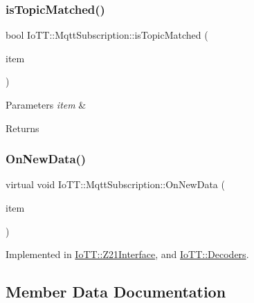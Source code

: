 \subsubsection{\texorpdfstring{is\+Topic\+Matched()}{isTopicMatched()}}
{\footnotesize\ttfamily bool Io\+T\+T\+::\+Mqtt\+Subscription\+::is\+Topic\+Matched (\begin{DoxyParamCaption}\item[{const \hyperlink{classIoTT_1_1mqttMessageQueueItem}{mqtt\+Message\+Queue\+Item} \&}]{item }\end{DoxyParamCaption})}


\begin{DoxyParams}{Parameters}
{\em item} & \\
\hline
\end{DoxyParams}
\begin{DoxyReturn}{Returns}

\end{DoxyReturn}
\mbox{\label{classIoTT_1_1MqttSubscription_a9ddc697ad6a842bd88ec0e768d8a1d37}} 
\subsubsection{\texorpdfstring{On\+New\+Data()}{OnNewData()}}
{\footnotesize\ttfamily virtual void Io\+T\+T\+::\+Mqtt\+Subscription\+::\+On\+New\+Data (\begin{DoxyParamCaption}\item[{const \hyperlink{classIoTT_1_1mqttMessageQueueItem}{mqtt\+Message\+Queue\+Item} \&}]{item }\end{DoxyParamCaption})\hspace{0.3cm}{\ttfamily [pure virtual]}}



Implemented in \hyperlink{classIoTT_1_1Z21Interface_adcb6084a5d89a8fb1f32fdb81009a90e}{Io\+T\+T\+::\+Z21\+Interface}, and \hyperlink{classIoTT_1_1Decoders_aa413a310e8ba87b11d3a7c2b02a90dc4}{Io\+T\+T\+::\+Decoders}.



\subsection{Member Data Documentation}
\mbox{\label{classIoTT_1_1MqttSubscription_a244de1721c3ba52f3920bee00fa7f73b}} 
